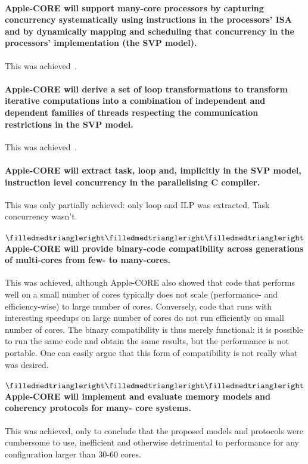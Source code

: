 \paragraph{Apple-CORE will support many-core processors by 
capturing concurrency systematically using 
instructions in the processors’ ISA and by dynamically mapping 
and scheduling that concurrency in the processors’ implementation (the SVP model).}
This was achieved~\cite{poss.12.dsd}.

\paragraph{Apple-CORE will derive a set of loop transformations to transform iterative computations into a combination of independent and dependent families of threads respecting the communication restrictions in the SVP model.}
This was achieved~\cite{saougkos.09.cpc,saougkos.11}.

\paragraph{Apple-CORE will extract task, loop and, implicitly in the SVP model, instruction level concurrency in the parallelising C compiler.}
This was only partially achieved: only loop and ILP was extracted. Task concurrency wasn't.

\paragraph{
$\filledmedtriangleright\filledmedtriangleright\filledmedtriangleright$
Apple-CORE will provide binary-code compatibility across generations of multi-cores from few- to many-cores.}
This was achieved, although Apple-CORE also showed that code that performs well on
a small number of cores typically does not scale (performance- and
efficiency-wise) to large number of cores. Conversely, code that runs
with interesting speedups on large number of cores do not run
efficiently on small number of cores. The binary compatibility is thus
merely functional: it is possible to run the same code and obtain the
same results, but the performance is not portable. One can easily
argue that this form of compatibility is not really what was desired.

\paragraph{
$\filledmedtriangleright\filledmedtriangleright\filledmedtriangleright$
Apple-CORE will implement and evaluate memory models and coherency protocols for many- core systems.}
This was achieved, only to conclude that the proposed models and
protocols were cumbersome to use, inefficient and otherwise
detrimental to performance for any configuration larger than 30-60
cores.

